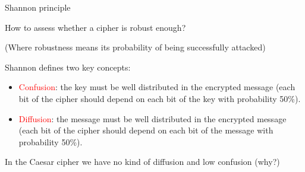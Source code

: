 \begin{frame}{Shannon principle}

  How to assess whether a cipher is robust enough? 
  
  (Where robustness means its probability of being successfully attacked)
  
  \medskip

  Shannon defines two key concepts:
  
  \begin{itemize}
    \item \textcolor{red}{Confusion}: the key must be well distributed in the encrypted message (each bit of the cipher should depend on each bit of the key with probability 50\%).
    \item \textcolor{red}{Diffusion}: the message must be well distributed in the encrypted message (each bit of the cipher should depend on each bit of the message with probability 50\%).
  \end{itemize}
  
  \medskip
  
  In the Caesar cipher we have no kind of diffusion and low confusion (why?)

\end{frame}


